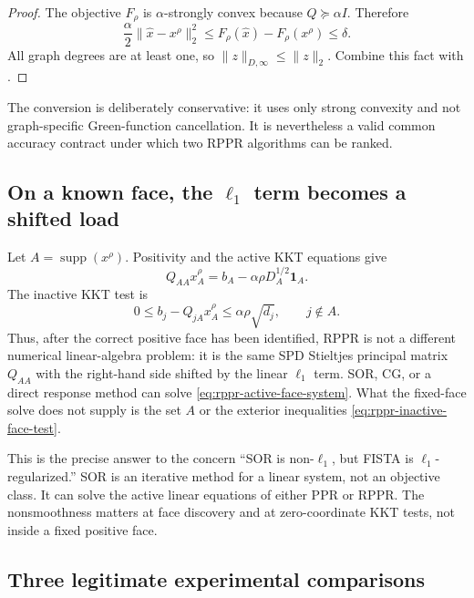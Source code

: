 \begin{proof}
The objective $F_\rho$ is $\alpha$-strongly convex because
$Q\succeq\alpha I$.  Therefore
\begin{equation*}
 \frac\alpha2\|\widehat x-x^\rho\|_2^2
 \leq F_\rho(\widehat x)-F_\rho(x^\rho)\leq\delta.
\end{equation*}
All graph degrees are at least one, so
$\|z\|_{D,\infty}\leq\|z\|_2$.  Combine this fact with
.
\end{proof}

The conversion is deliberately conservative: it uses only strong convexity
and not graph-specific Green-function cancellation.  It is nevertheless a
valid common accuracy contract under which two RPPR algorithms can be ranked.

\subsection{On a known face, the \texorpdfstring{$\ell_1$}{l1} term becomes a shifted load}

Let $A=\operatorname{supp}(x^\rho)$.  Positivity and the active KKT equations
give
\begin{equation}
 Q_{AA}x_A^\rho
 =b_A-\alpha\rho D_A^{1/2}\mathbf1_A.
 \label{eq:rppr-active-face-system}
\end{equation}
The inactive KKT test is
\begin{equation}
 0\leq b_j-Q_{jA}x_A^\rho
 \leq\alpha\rho\sqrt{d_j},
 \qquad j\notin A.
 \label{eq:rppr-inactive-face-test}
\end{equation}
Thus, after the correct positive face has been identified, RPPR is not a
different numerical linear-algebra problem: it is the same SPD Stieltjes
principal matrix $Q_{AA}$ with the right-hand side shifted by the linear
$\ell_1$ term.  SOR, CG, or a direct response method can solve
\eqref{eq:rppr-active-face-system}.  What the fixed-face solve does not supply
is the set $A$ or the exterior inequalities \eqref{eq:rppr-inactive-face-test}.

This is the precise answer to the concern ``SOR is non-$\ell_1$, but FISTA is
$\ell_1$-regularized.''  SOR is an iterative method for a linear system, not
an objective class.  It can solve the active linear equations of either PPR
or RPPR.  The nonsmoothness matters at face discovery and at zero-coordinate
KKT tests, not inside a fixed positive face.

\subsection{Three legitimate experimental comparisons}

